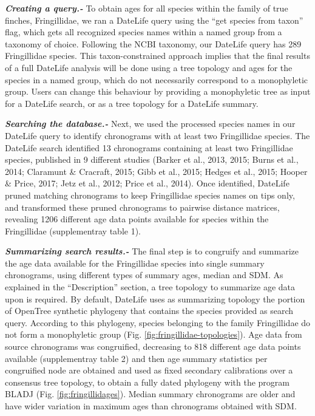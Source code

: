 \documentclass[
  english,
  man]{apa6}
\begin{document}
\emph{\textbf{Creating a query.-}}
To obtain ages for all species within the family of true finches, Fringillidae, we ran a DateLife query using the ``get species from taxon'' flag,
which gets all recognized species names within a named group from a taxonomy of choice.
Following the NCBI taxonomy, our DateLife query has 289 Fringillidae species.
This taxon-constrained approach implies that the final results of a full DateLife analysis will be done using a tree topology and ages for the species in a named group, which do not necessarily correspond to a monophyletic group. Users can change this behaviour by providing a monophyletic tree as input for a DateLife search, or as a tree topology for a DateLife summary.

\emph{\textbf{Searching the database.-}}
Next, we used the processed species names in our DateLife query to identify chronograms with at least two Fringillidae species.
The DateLife search identified 13 chronograms containing at least two Fringillidae species, published in 9 different studies (Barker et al., 2013, 2015; Burns et al., 2014; Claramunt \& Cracraft, 2015; Gibb et al., 2015; Hedges et al., 2015; Hooper \& Price, 2017; Jetz et al., 2012; Price et al., 2014).
Once identified, DateLife pruned matching chronograms to keep Fringillidae species names on tips only, and transformed these pruned chronograms to pairwise distance matrices, revealing 1206 different age data points available for species within the Fringillidae (supplementray table 1).

\emph{\textbf{Summarizing search results.-}}
The final step is to congruify and summarize the age data available for the Fringillidae species into single summary chronograms, using different types of summary ages, median and SDM.
As explained in the ``Description'' section, a tree topology to summarize age data upon is required.
By default, DateLife uses as summarizing topology the portion of OpenTree synthetic phylogeny that contains the species provided as search query.
According to this phylogeny, species belonging to the family Fringillidae do not form a monophyletic group (Fig. \ref{fig:fringillidae-topologies}).
Age data from source chronograms was congruified, decreasing to 818 different age data points available (supplementray table 2) and then age summary statistics per congruified node are obtained and used as fixed secondary calibrations over a consensus tree topology, to obtain a fully dated phylogeny with the program BLADJ (Fig. \ref{fig:fringillidages}).
Median summary chronograms are older and have wider variation in maximum ages than chronograms obtained with SDM.
\end{document}
